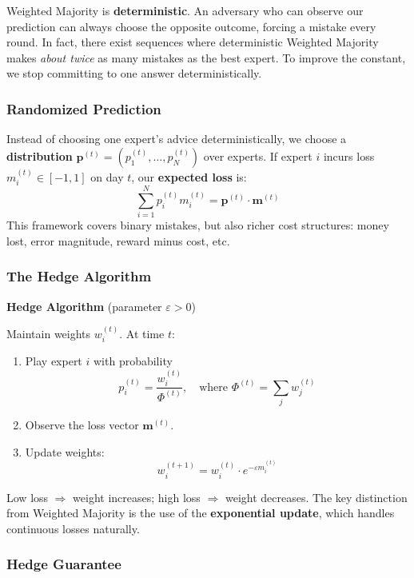 Weighted Majority is \textbf{deterministic}. An adversary who can observe our prediction can always choose the opposite outcome, forcing a mistake every round. In fact, there exist sequences where deterministic Weighted Majority makes \emph{about twice} as many mistakes as the best expert. To improve the constant, we stop committing to one answer deterministically.

\subsubsection{Randomized Prediction}

Instead of choosing one expert's advice deterministically, we choose a \textbf{distribution} $\mathbf{p}^{(t)} = (p_1^{(t)}, \ldots, p_N^{(t)})$ over experts. If expert $i$ incurs loss $m_i^{(t)} \in [-1, 1]$ on day $t$, our \textbf{expected loss} is:
\[
\sum_{i=1}^N p_i^{(t)} m_i^{(t)} = \mathbf{p}^{(t)} \cdot \mathbf{m}^{(t)}
\]
This framework covers binary mistakes, but also richer cost structures: money lost, error magnitude, reward minus cost, etc.

\subsubsection{The Hedge Algorithm}

\begin{mdframed}[backgroundcolor=lightblue, linecolor=keyblue, linewidth=1pt]
\textbf{Hedge Algorithm} (parameter $\varepsilon > 0$)

Maintain weights $w_i^{(t)}$. At time $t$:
\begin{enumerate}
  \item Play expert $i$ with probability
    \[
      p_i^{(t)} = \frac{w_i^{(t)}}{\Phi^{(t)}}, \quad \text{where } \Phi^{(t)} = \sum_j w_j^{(t)}
    \]
  \item Observe the loss vector $\mathbf{m}^{(t)}$.
  \item Update weights:
    \[
      w_i^{(t+1)} = w_i^{(t)} \cdot e^{-\varepsilon m_i^{(t)}}
    \]
\end{enumerate}
\end{mdframed}

Low loss $\Rightarrow$ weight increases; high loss $\Rightarrow$ weight decreases. The key distinction from Weighted Majority is the use of the \textbf{exponential update}, which handles continuous losses naturally.

\subsubsection{Hedge Guarantee}

